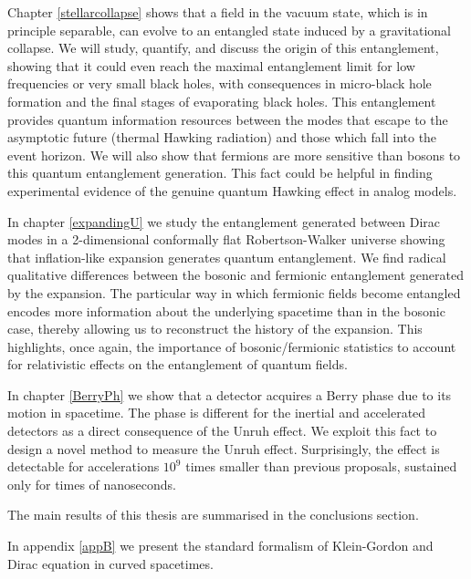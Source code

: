 \begin{list}{}{\leftmargin=1em}
\begin{list}{}{\leftmargin=1em}
\item Chapter \ref{stellarcollapse} shows that a field in the vacuum state, which is  in principle  separable, can evolve to an entangled state  induced by a  gravitational collapse. We will study, quantify, and discuss the origin of this entanglement, showing that it could even reach the maximal entanglement limit for low frequencies or very small black holes, with consequences in micro-black hole formation and the final stages of evaporating black holes. This entanglement provides quantum information resources between the modes that escape to the asymptotic future (thermal Hawking radiation) and those which fall into the event horizon. We will also show that  fermions are more sensitive than bosons to this quantum entanglement generation. This fact could be helpful in finding experimental evidence of the genuine quantum Hawking effect in analog models.
\item In chapter \ref{expandingU}  we study the entanglement generated between Dirac modes in a 2-dimensional conformally flat Robertson-Walker universe showing that inflation-like expansion generates quantum entanglement.  We find radical qualitative differences between the bosonic and fermionic entanglement generated by the expansion. The particular way in which fermionic fields become entangled encodes more information about the underlying spacetime than in the bosonic case, thereby allowing us to reconstruct the history of the expansion. This highlights, once again, the importance of bosonic/fermionic statistics to account for relativistic effects on the entanglement of quantum fields.
\item In chapter \ref{BerryPh} we show that a detector acquires a Berry phase due to its motion in spacetime. The phase is different for the inertial and accelerated detectors as a direct consequence of the Unruh effect. We exploit this fact to design a novel method to measure the Unruh effect.  Surprisingly, the effect is detectable for accelerations $10^9$ times smaller than previous proposals, sustained only for times of nanoseconds.
\end{list}
\end{list}

 The main results of this thesis are summarised in the conclusions section.

In appendix \ref{appB} we present the standard formalism of Klein-Gordon and Dirac equation in curved spacetimes. 


\cleardoublepage





